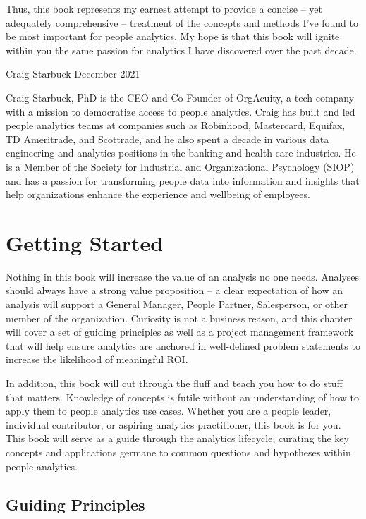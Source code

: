 \documentclass[]{book}
\begin{document}
Thus, this book represents my earnest attempt to provide a concise -- yet adequately comprehensive -- treatment of the concepts and methods I've found to be most important for people analytics. My hope is that this book will ignite within you the same passion for analytics I have discovered over the past decade.

Craig Starbuck
December 2021

Craig Starbuck, PhD is the CEO and Co-Founder of OrgAcuity, a tech company with a mission to democratize access to people analytics. Craig has built and led people analytics teams at companies such as Robinhood, Mastercard, Equifax, TD Ameritrade, and Scottrade, and he also spent a decade in various data engineering and analytics positions in the banking and health care industries. He is a Member of the Society for Industrial and Organizational Psychology (SIOP) and has a passion for transforming people data into information and insights that help organizations enhance the experience and wellbeing of employees.

\hypertarget{getting-started}{%
\chapter{Getting Started}\label{getting-started}}

Nothing in this book will increase the value of an analysis no one needs. Analyses should always have a strong value proposition -- a clear expectation of how an analysis will support a General Manager, People Partner, Salesperson, or other member of the organization. Curiosity is not a business reason, and this chapter will cover a set of guiding principles as well as a project management framework that will help ensure analytics are anchored in well-defined problem statements to increase the likelihood of meaningful ROI.

In addition, this book will cut through the fluff and teach you how to do stuff that matters. Knowledge of concepts is futile without an understanding of how to apply them to people analytics use cases. Whether you are a people leader, individual contributor, or aspiring analytics practitioner, this book is for you. This book will serve as a guide through the analytics lifecycle, curating the key concepts and applications germane to common questions and hypotheses within people analytics.

\hypertarget{guiding-principles}{%
\section{Guiding Principles}\label{guiding-principles}}
\end{document}
